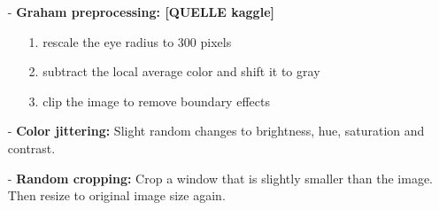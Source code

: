 \documentclass{article}
\begin{document}
\begin{itemize}
  \item[-] \textbf{Graham preprocessing:  [QUELLE kaggle]} \begin{itemize}
    \item[1.] rescale the eye radius to 300 pixels 
    \item[2.] subtract the local average color and shift it to gray
    \item[3.] clip the image to remove boundary effects
  \end{itemize}   
  \item[-] \textbf{Color jittering:} Slight random changes to brightness, hue, saturation and contrast.
  \item[-] \textbf{Random cropping:} Crop a window that is slightly smaller than the image. Then resize to original image size again.
\end{itemize}

\end{document}
